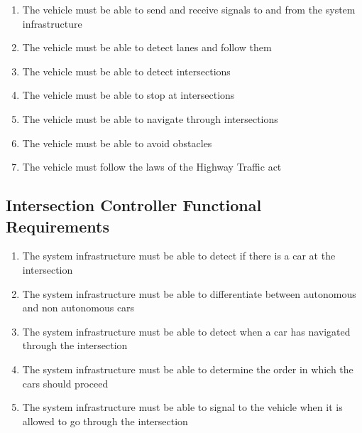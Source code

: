 \documentclass [12pt]{article}
\begin{document}
\begin{enumerate}[label=\textbf{V\arabic*:}, leftmargin=0.7in]

	
	\item The vehicle must be able to send and receive signals to and from the system infrastructure
	
	\item The vehicle must be able to detect lanes and follow them
    
    \item The vehicle must be able to detect intersections 
    
    \item The vehicle must be able to stop at intersections
    
    \item The vehicle must be able to navigate through intersections
    
    \item The vehicle must be able to avoid obstacles 
    
    \item The vehicle must follow the laws of the Highway Traffic act
\end{enumerate}




\subsection{Intersection Controller Functional Requirements}
\begin{enumerate}[label=\textbf{IC\arabic*:}, leftmargin=0.8in]

	\item The system infrastructure must be able to detect if there is a car at the intersection
	
	\item The system infrastructure must be able to differentiate between autonomous and non autonomous cars
	
	\item The system infrastructure must be able to detect when a car has navigated through the intersection

    \item The system infrastructure must be able to determine the order in which the cars should proceed
    
    \item The system infrastructure must be able to signal to the vehicle when it is allowed to go through the intersection
\end{enumerate}
\end{document}
